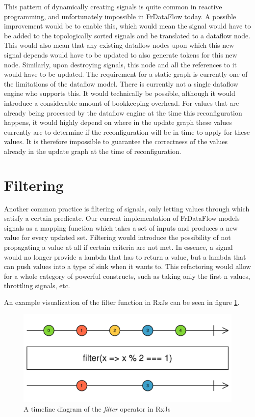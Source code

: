 This pattern of dynamically creating signals is quite common in reactive programming, and unfortunately impossible in FrDataFlow today. A possible improvement would be to enable this, which would mean the signal would have to be added to the topologically sorted signals and be translated to a dataflow node. This would also mean that any existing dataflow nodes upon which this new signal depends would have to be updated to also generate tokens for this new node. Similarly, upon destroying signals, this node and all the references to it would have to be updated. The requirement for a static graph is currently one of the limitations of the dataflow model. There is currently not a single dataflow engine who supports this. It would technically be possible, although it would introduce a considerable amount of bookkeeping overhead. For values that are already being processed by the dataflow engine at the time this reconfiguration happens, it would highly depend on where in the update graph these values currently are to determine if the reconfiguration will be in time to apply for these values. It is therefore impossible to guarantee the correctness of the values already in the update graph at the time of reconfiguration. 

\section{Filtering}

Another common practice is filtering of signals, only letting values through which satisfy a certain predicate. Our current implementation of FrDataFlow models signals as a mapping function which takes a set of inputs and produces a new value for every updated set. Filtering would introduce the possibility of not propagating a value at all if certain criteria are not met. In essence, a signal would no longer provide a lambda that has to return a value, but a lambda that can push values into a type of sink when it wants to. This refactoring would allow for a whole category of powerful constructs, such as taking only the first n values, throttling signals, etc. 

An example visualization of the filter function in RxJs can be seen in figure  \ref{fig:futurework-filtering-filter}. 

\begin{figure}[h!]
	\includegraphics[width=\textwidth]{images/FutureWork-Filtering-Filter.png}
	\caption{A timeline diagram of the \textit{filter} operator in RxJs}
	\label{fig:futurework-filtering-filter}
\end{figure}

